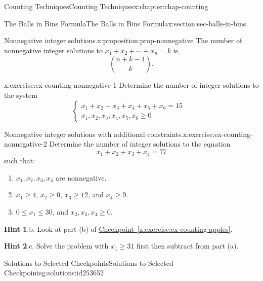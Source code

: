 \documentclass[oneside,10pt,]{book}
\newcommand{\blocktitlefont}{\relax}
\newcommand{\xreffont}{\relax}
\numberwithin{equation}{section}
\newcommand{\amp}{&}
\begin{document}
\begin{chapterptx}{Counting Techniques}{}{Counting Techniques}{}{}{x:chapter:chap-counting}
\begin{sectionptx}{The Balls in Bins Formula}{}{The Balls in Bins Formula}{}{}{x:section:sec-balls-in-bins}
\begin{proposition}{Nonnegative integer solutions.}{}{x:proposition:prop-nonnegative}%
The number of nonnegative integer solutions to \(x_1 + x_2 + \cdots + x_n = k\) is%
\begin{equation*}
\displaystyle\binom{n+k-1}{k}\text{.}
\end{equation*}
%
\end{proposition}
\begin{inlineexercise}{}{x:exercise:ex-counting-nonnegative-1}%
Determine the number of integer solutions to the system%
\begin{equation*}
\begin{cases}
x_1 + x_2 + x_3 + x_4 + x_5 + x_6 = 15 \amp \\ x_1, x_2, x_3, x_4, x_5, x_6 \geq 0 \amp
\end{cases}
\end{equation*}
%
\end{inlineexercise}
\begin{inlineexercise}{Nonnegative integer solutions with additional constraints.}{x:exercise:ex-counting-nonnegative-2}%
Determine the number of integer solutions to the equation%
\begin{equation*}
x_1 + x_2 + x_3 + x_4 = 77
\end{equation*}
such that:%
\begin{enumerate}[label=(\alph*)]
\item{}\(x_1, x_2, x_3, x_4\) are nonnegative.%
\item{}\(x_1 \geq 4\), \(x_2 \geq 0\), \(x_3 \geq 12\), and \(x_4 \geq 9\).%
\item{}\(0 \leq x_1 \leq 30\), and \(x_2, x_3, x_4 \geq 0\).%
\end{enumerate}
%
\par\smallskip%
\noindent\textbf{\blocktitlefont Hint 1}.\hypertarget{g:hint:id228768}{}\quad{}b. Look at part (b) of \hyperref[x:exercise:ex-counting-apples]{Checkpoint~{\xreffont\ref{x:exercise:ex-counting-apples}}}.%
\par\smallskip%
\noindent\textbf{\blocktitlefont Hint 2}.\hypertarget{g:hint:id228818}{}\quad{}c. Solve the problem with \(x_1 \geq 31\) first then subtract from part (a).%
\end{inlineexercise}
%
%
\typeout{************************************************}
\typeout{************************************************}
%
\begin{solutions-subsection}{Solutions to Selected Checkpoints}{}{Solutions to Selected Checkpoints}{}{}{g:solutions:id253652}

\end{solutions-subsection}
\end{sectionptx}
\end{chapterptx}
\end{document}
